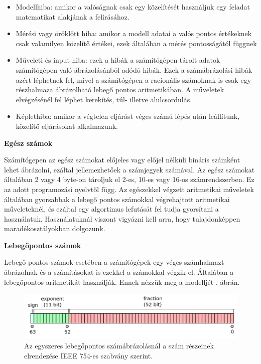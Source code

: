 \begin{itemize}
\item
  Modellhiba: amikor a valóságnak csak egy közelítését használjuk egy
  feladat matematikat alakjának a felírásához.
\item
  Mérési vagy öröklött hiba: amikor a modell adatai a valós pontos
  értékeknek csak valamilyen közelítő értékei, ezek általában a mérés
  pontosságától függnek
\item
  Műveleti és input hiba: ezek a hibák a számítógépen tárolt adatok
  számítógépen való ábrázolásánból adódó hibák. Ezek a számábrázolási
  hibák azért léphetnek fel, mivel a számítógépen a racionális számoknak
  is csak egy részhalmaza ábrázolható lebegő pontos aritmetikában. A
  műveletek elvégzésénél fel léphet kerekítés, túl- illetve
  alulcsordulás.
\item
  Képlethiba: amikor a végtelen eljárást véges számú lépés után
  leállítunk, közelítő eljárásokat alkalmazunk.
\end{itemize}


\bigskip

\noindent\textbf{Egész számok}

\medskip

Számítógepen az egész számokat előjeles vagy előjel nélküli bináris
számként lehet ábrázolni, ezáltal jellemezhetőek a számjegyek számával.
Az egész számokat általában 2 vagy 4 byte-on tároljuk el 2-es, 10-es vagy
16-os számrendszerben. Ez az adott programozási nyelvtől függ. Az
egészekkel végzett aritmetikai műveletek általában gyorsabbak a lebegő pontos
számokkal végrehajtott aritmetikai műveleteknél, és ezáltal egy
algortimus lefutását fel tudja gyorsítani a használatuk. Használatuknál viszont
vigyázni kell arra, hogy tulajdonképpen maradékosztályokban dolgozunk.

\bigskip

\noindent\textbf{Lebegőpontos számok}

\medskip

Lebegő pontos számok esetében a számítógépek egy véges számhalmazt
ábrázolnak és a számításokat is ezekkel a számokkal végzik el.
Általában a lebegőpontos aritmetikát használják. Ennek nézzük meg a modelljét . ábrán.

\begin{figure}[h!]
\centering
\includegraphics[width=\textwidth]{img/ieee.png}
\caption{Az egyszeres lebegőpontos számábrázolásnál a szám részeinek elrendezése IEEE 754-es szabvány szerint.}
\label{fig:ieee}
\end{figure}


